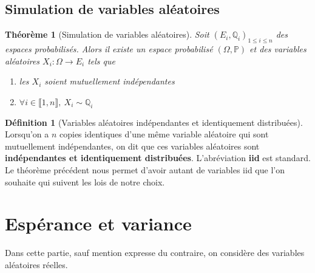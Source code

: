 \documentclass[french]{book}
\renewcommand{\P}{\mathbb{P}}
\newcommand{\Q}{\mathbb{Q}}
\theoremstyle{plain}
\newtheorem{thm}{Théorème}[chapter]
\theoremstyle{definition}
\newtheorem{dfn}{Définition}[chapter]
\theoremstyle{remark}
\begin{document}
\subsection{Simulation de variables aléatoires}
\begin{thm}[Simulation de variables aléatoires]
	Soit $(E_i,\Q_i)_{1\leqslant i\leqslant n}$ des espaces probabilisés. Alors il existe un espace probabilisé $(\Omega,\P)$ et des variables aléatoires $X_i:\Omega\rightarrow E_i$ tels que 
	\begin{enumerate}
		\item les $X_i$ soient mutuellement indépendantes
		\item $\forall i\in\llbracket1,n\rrbracket,\ X_i\sim\Q_i$
	\end{enumerate}
\end{thm}
\begin{dfn}[Variables aléatoires indépendantes et identiquement distribuées]
	Lorsqu'on a $n$ copies identiques d'une même variable aléatoire qui sont mutuellement indépendantes, on dit que ces variables aléatoires sont \textbf{indépendantes et identiquement distribuées}. L'abréviation \textbf{iid} est standard. Le théorème précédent nous permet d'avoir autant de variables iid que l'on souhaite qui suivent les lois de notre choix.
\end{dfn}
\section{Espérance et variance}
Dans cette partie, sauf mention expresse du contraire, on considère des variables aléatoires réelles.
\end{document}
